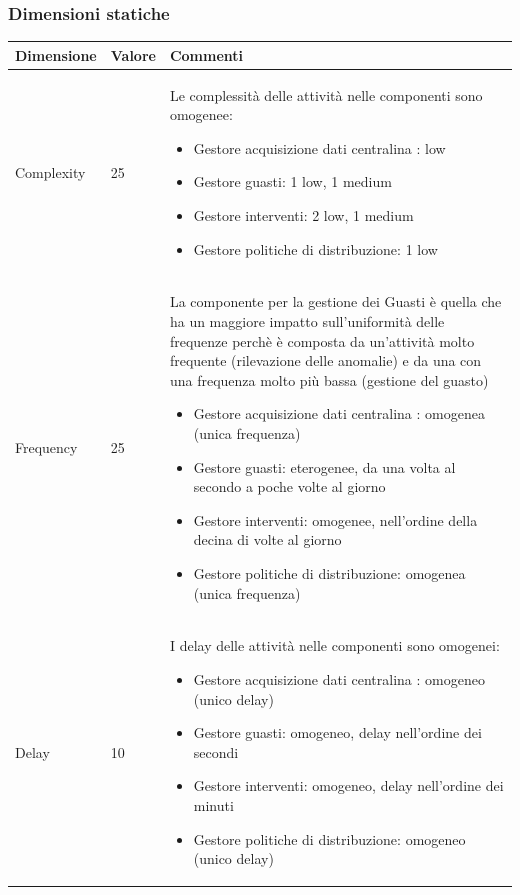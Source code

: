 \documentclass{beamer}
\begin{document}
	\begin{frame}[allowframebreaks]
		\frametitle{Dimensioni statiche}			
		\begin{center}
			\begin{table}
				\tiny
				\centering
				{\renewcommand{\arraystretch}{1.2}
					
					\begin{tabular}{|M{0.1\textwidth}|M{0.1\textwidth}|p{.6\textwidth}|}
						\hline
						Dimensione & Valore & Commenti \\
						\hline
						Complexity & 25 & Le complessità delle attività nelle componenti sono omogenee:
						\begin{itemize}
								\item Gestore acquisizione dati centralina : low
								\item Gestore guasti: 1 low, 1 medium
								\item Gestore interventi: 2 low, 1 medium
								\item Gestore politiche di distribuzione: 1 low
						\end{itemize} \\
						Frequency & 25 & La componente per la gestione dei Guasti è quella che ha un maggiore impatto sull'uniformità delle frequenze perchè è composta da un'attività molto frequente (rilevazione delle anomalie) e da una con una frequenza molto più bassa (gestione del guasto)
						\begin{itemize}
							\item Gestore acquisizione dati centralina : omogenea (unica frequenza)
							\item Gestore guasti: eterogenee, da una volta al secondo a poche volte al giorno
							\item Gestore interventi: omogenee, nell'ordine della decina di volte al giorno
							\item Gestore politiche di distribuzione:  omogenea (unica frequenza)
						\end{itemize} \\
						Delay & 10 & I delay delle attività nelle componenti sono omogenei:
						\begin{itemize}
							\item Gestore acquisizione dati centralina : omogeneo (unico delay)
							\item Gestore guasti: omogeneo, delay nell'ordine dei secondi
							\item Gestore interventi: omogeneo, delay nell'ordine dei minuti
							\item Gestore politiche di distribuzione: omogeneo (unico delay)
						\end{itemize} \\
						\hline
				\end{tabular}}
			\end{table}
		\end{center}
	

\end{frame}
\end{document}
